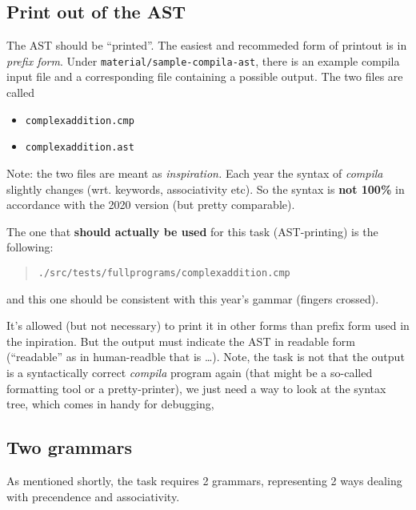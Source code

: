 \documentclass[10pt,freeform]{handout}[2014/08/13]
\begin{document}
\subsection{Print out of the AST}
\label{sec:print-out-ast}


The AST should be ``printed''. The easiest and recommeded form of printout
is in \emph{prefix form}. Under \texttt{material/sample-compila-ast}, there
is an example compila input file and a corresponding file containing a
possible output. The two files are called

\begin{itemize}
\item \texttt{complexaddition.cmp}
\item \texttt{complexaddition.ast}
\end{itemize}


Note: the two files are meant as \emph{inspiration.} Each year the syntax
of \textsl{compila} slightly changes (wrt. keywords, associativity etc). So
the syntax is \textbf{not 100\%} in accordance with the 2020 version (but
pretty comparable).

The one that \textbf{should actually be used} for this task (AST-printing)
is the following:

\begin{quote}
  \texttt{./src/tests/fullprograms/complexaddition.cmp}  
\end{quote}

and this one should be consistent with this year's gammar (fingers
crossed).



It's allowed (but not necessary) to print it in other forms than prefix
form used in the inpiration. But the output must indicate the AST in
readable form (``readable'' as in human-readble that is \ldots). Note, the
task is not that the output is a syntactically correct \textsl{compila}
program again (that might be a so-called formatting tool or a
pretty-printer), we just need a way to look at the syntax tree, which comes
in handy for debugging,


%
% 

\subsection{Two grammars}
\label{sec:two-grammars}


As mentioned shortly, the task requires 2 grammars, representing 2 ways
dealing with precendence and associativity.
\end{document}

